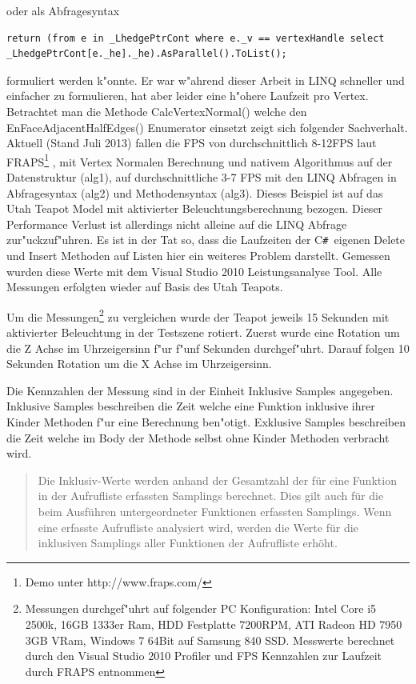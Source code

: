 \documentclass[pagesize, paper=a4, fontsize=12pt,titlepage=true, headings=small, headnosepline, abstractoff, liststotoc, nochapterprefix, plainheadsepline]{scrreprt}
\newcommand{\CSS}{C\texttt{\# }}
\begin{document}
oder als Abfragesyntax
\begin{lstlisting}[label={code:alg2}]
return (from e in _LhedgePtrCont where e._v == vertexHandle select _LhedgePtrCont[e._he]._he).AsParallel().ToList();
\end{lstlisting}
 formuliert werden k"onnte. Er war w"ahrend dieser Arbeit in LINQ schneller und einfacher zu formulieren, hat aber leider eine h"ohere Laufzeit pro Vertex. Betrachtet man die Methode CalcVertexNormal() welche den EnFaceAdjacentHalfEdges() Enumerator einsetzt zeigt sich folgender Sachverhalt. Aktuell (Stand Juli 2013) fallen die FPS von durchschnittlich 8-12FPS laut FRAPS\footnote{ Demo unter http://www.fraps.com/} , mit Vertex Normalen Berechnung und nativem Algorithmus auf der Datenstruktur (alg1\label{code:alg1}), auf durchschnittliche 3-7 FPS mit den LINQ Abfragen in Abfragesyntax (alg2\label{code:alg2}) und Methodensyntax (alg3\label{code:alg3}). Dieses Beispiel ist auf das Utah Teapot Model mit aktivierter Beleuchtungsberechnung bezogen. Dieser Performance Verlust ist allerdings nicht alleine auf die LINQ Abfrage zur"uckzuf"uhren. Es ist in der Tat so, dass die Laufzeiten der \CSS eigenen Delete und Insert Methoden auf Listen hier ein weiteres Problem darstellt. Gemessen wurden diese Werte mit dem Visual Studio 2010 Leistungsanalyse Tool. Alle Messungen erfolgten wieder auf Basis des Utah Teapots.
\newline

Um die Messungen\footnote{\label{fn-messungenPC} Messungen durchgef"uhrt auf folgender PC Konfiguration: Intel Core i5 2500k, 16GB 1333er Ram, HDD Festplatte 7200RPM, ATI Radeon HD 7950 3GB VRam, Windows 7 64Bit auf Samsung 840 SSD. Messwerte berechnet durch den Visual Studio 2010 Profiler und FPS Kennzahlen zur Laufzeit durch FRAPS entnommen} zu vergleichen wurde der Teapot jeweils 15 Sekunden mit aktivierter Beleuchtung in der Testszene rotiert. Zuerst wurde eine Rotation um die Z Achse im Uhrzeigersinn f"ur f"unf Sekunden durchgef"uhrt. Darauf folgen 10 Sekunden Rotation um die X Achse im Uhrzeigersinn.

Die Kennzahlen der Messung sind in der Einheit Inklusive Samples angegeben. Inklusive Samples beschreiben die Zeit welche eine Funktion inklusive ihrer Kinder Methoden f"ur eine Berechnung ben"otigt. Exklusive Samples beschreiben die Zeit welche im Body der Methode selbst ohne Kinder Methoden verbracht wird.

\begin{quote}Die Inklusiv-Werte werden anhand der Gesamtzahl der f{\"u}r eine Funktion in der Aufrufliste erfassten Samplings berechnet. Dies gilt auch f{\"u}r die beim Ausf{\"u}hren untergeordneter Funktionen erfassten Samplings. Wenn eine erfasste Aufrufliste analysiert wird, werden die Werte f{\"u}r die inklusiven Samplings aller Funktionen der Aufrufliste erh{\"o}ht. \cite[Analyse von Leistungsdaten]{MicrosoftCReferenz.2013}\end{quote}
\end{document}
